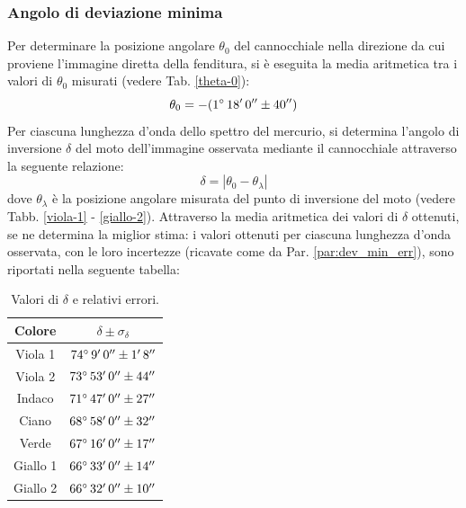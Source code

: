 \documentclass[]{article}
\begin{document}
    \subsubsection{Angolo di deviazione minima}
    Per determinare la posizione angolare $\theta_0$ del cannocchiale nella direzione da cui proviene l'immagine diretta della fenditura, si è eseguita la media aritmetica tra i valori di $\theta_0$ misurati (vedere Tab. \ref{theta-0}):
    \begin{equation}
        \label{theta-0-eq}
        \theta_0 = -(1 \degree \, 18' \, 0'' \pm 40'') 
    \end{equation}
    Per ciascuna lunghezza d'onda dello spettro del mercurio, si determina l'angolo di inversione $\delta$ del moto dell'immagine osservata mediante il cannocchiale attraverso la seguente relazione:
    \begin{equation}
        \label{delta}
        \delta = | \theta_0 - \theta_{\lambda}|
    \end{equation}
    dove $\theta_{\lambda}$ è la posizione angolare misurata del punto di inversione del moto (vedere Tabb. \ref{viola-1} - \ref{giallo-2}).
    Attraverso la media aritmetica dei valori di $\delta$ ottenuti, se ne determina la miglior stima: i valori ottenuti per ciascuna lunghezza d'onda osservata, con le loro incertezze (ricavate come da Par. \ref{par:dev_min_err}), sono riportati nella seguente tabella:
    \begin{table} [H]
        \centering
        \begin{tabular}{||c|c||}
            \hline
            Colore & $\delta \pm \sigma_{\delta}$\\
            \hline \hline
            Viola 1  & $ 74 \degree \,  9' \, 0'' \pm  1' \,  8'' $ \\\hline
            Viola 2  & $ 73 \degree \, 53' \, 0'' \pm  44'' $ \\\hline
            Indaco   & $ 71 \degree \, 47' \, 0'' \pm 27''         $ \\\hline
            Ciano    & $ 68 \degree \, 58' \, 0'' \pm  32'' $ \\\hline
            Verde    & $ 67 \degree \, 16' \, 0'' \pm   17'' $ \\\hline
            Giallo 1 & $ 66 \degree \, 33' \, 0'' \pm    14'' $ \\\hline
            Giallo 2 & $ 66 \degree \, 32' \, 0'' \pm        10'' $ \\\hline
        \end{tabular}
        \caption{Valori di $\delta$ e relativi errori.}
        \label{d-values}
    \end{table}
\end{document}

